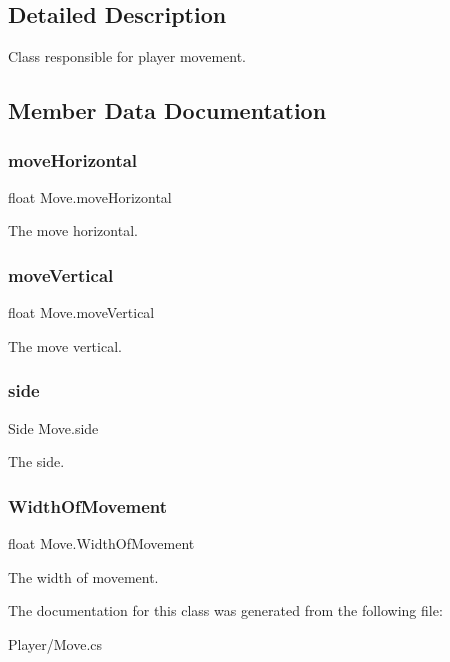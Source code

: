 \subsection{Detailed Description}
Class responsible for player movement. 



\subsection{Member Data Documentation}
\mbox{\label{class_move_a2777ede3b7fbfd425deb04fe8fd69791}} 
\subsubsection{\texorpdfstring{move\+Horizontal}{moveHorizontal}}
{\footnotesize\ttfamily float Move.\+move\+Horizontal}



The move horizontal. 

\mbox{\label{class_move_a248dd0919f2777f32c019ca10c342629}} 
\subsubsection{\texorpdfstring{move\+Vertical}{moveVertical}}
{\footnotesize\ttfamily float Move.\+move\+Vertical}



The move vertical. 

\mbox{\label{class_move_a0cf32cb803f7b4783a49ea55c9746dba}} 
\subsubsection{\texorpdfstring{side}{side}}
{\footnotesize\ttfamily Side Move.\+side}



The side. 

\mbox{\label{class_move_a564c70756027d119d684db3edfede659}} 
\subsubsection{\texorpdfstring{Width\+Of\+Movement}{WidthOfMovement}}
{\footnotesize\ttfamily float Move.\+Width\+Of\+Movement}



The width of movement. 



The documentation for this class was generated from the following file\+:\begin{DoxyCompactItemize}
\item 
Player/Move.\+cs\end{DoxyCompactItemize}
